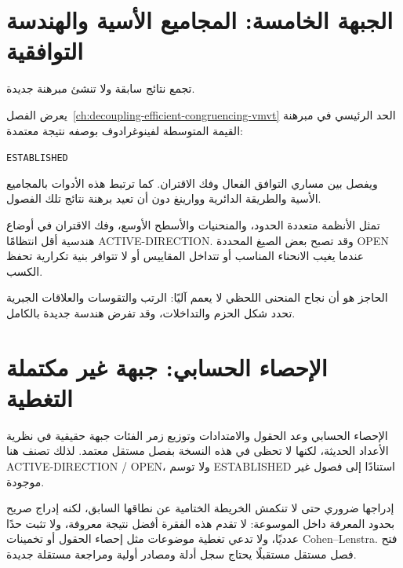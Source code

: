 \section{الجبهة الخامسة: المجاميع الأسية والهندسة التوافقية}

\begin{remark}
\label{map:ch26-exponential-decoupling}
\noindent{}\quad تجمع نتائج سابقة ولا تنشئ مبرهنة جديدة.\par
{}
يعرض الفصل~\ref{ch:decoupling-efficient-congruencing-vmvt}
الحد الرئيسي في مبرهنة القيمة المتوسطة لفينوغرادوف بوصفه نتيجة معتمدة:

\begin{center}
\small\textenglish{\texttt{ESTABLISHED}}
\end{center}

ويفصل بين مساري التوافق الفعال وفك الاقتران. كما ترتبط هذه الأدوات بالمجاميع الأسية والطريقة الدائرية ووارينغ دون أن تعيد برهنة نتائج تلك الفصول.

تمثل الأنظمة متعددة الحدود، والمنحنيات والأسطح الأوسع، وفك الاقتران في أوضاع هندسية أقل انتظامًا \textenglish{ACTIVE-DIRECTION}. وقد تصبح بعض الصيغ المحددة \textenglish{OPEN} عندما يغيب الانحناء المناسب أو تتداخل المقاييس أو لا تتوافر بنية تكرارية تحفظ الكسب.

الحاجز هو أن نجاح المنحنى اللحظي لا يعمم آليًا: الرتب والتقوسات والعلاقات الجبرية تحدد شكل الحزم والتداخلات، وقد تفرض هندسة جديدة بالكامل.
\end{remark}

\section{الإحصاء الحسابي: جبهة غير مكتملة التغطية}

الإحصاء الحسابي وعد الحقول والامتدادات وتوزيع زمر الفئات جبهة حقيقية في نظرية الأعداد الحديثة، لكنها لا تحظى في هذه النسخة بفصل مستقل معتمد. لذلك تصنف هنا \textenglish{ACTIVE-DIRECTION / OPEN}، ولا توسم \textenglish{ESTABLISHED} استنادًا إلى فصول غير موجودة.

إدراجها ضروري حتى لا تنكمش الخريطة الختامية عن نطاقها السابق، لكنه إدراج صريح بحدود المعرفة داخل الموسوعة: لا تقدم هذه الفقرة أفضل نتيجة معروفة، ولا تثبت حدًا عدديًا، ولا تدعي تغطية موضوعات مثل إحصاء الحقول أو تخمينات Cohen--Lenstra. فتح فصل مستقل مستقبلًا يحتاج سجل أدلة ومصادر أولية ومراجعة مستقلة جديدة.

